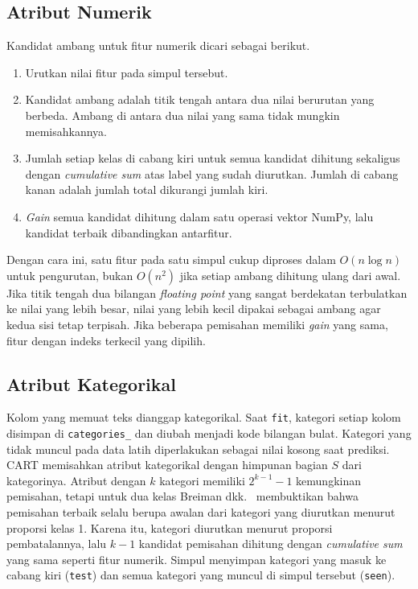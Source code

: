 \subsection{Atribut Numerik}

Kandidat ambang untuk fitur numerik dicari sebagai berikut.
\begin{enumerate}
	\item Urutkan nilai fitur pada simpul tersebut.
	\item Kandidat ambang adalah titik tengah antara dua nilai berurutan yang
	berbeda. Ambang di antara dua nilai yang sama tidak mungkin memisahkannya.
	\item Jumlah setiap kelas di cabang kiri untuk semua kandidat dihitung
	sekaligus dengan \textit{cumulative sum} atas label yang sudah diurutkan.
	Jumlah di cabang kanan adalah jumlah total dikurangi jumlah kiri.
	\item \textit{Gain} semua kandidat dihitung dalam satu operasi vektor NumPy,
	lalu kandidat terbaik dibandingkan antarfitur.
\end{enumerate}
Dengan cara ini, satu fitur pada satu simpul cukup diproses dalam
$O(n\log n)$ untuk pengurutan, bukan $O(n^2)$ jika setiap ambang dihitung ulang
dari awal. Jika titik tengah dua bilangan \textit{floating point} yang sangat
berdekatan terbulatkan ke nilai yang lebih besar, nilai yang lebih kecil dipakai
sebagai ambang agar kedua sisi tetap terpisah. Jika beberapa pemisahan memiliki
\textit{gain} yang sama, fitur dengan indeks terkecil yang dipilih.

\subsection{Atribut Kategorikal}

Kolom yang memuat teks dianggap kategorikal. Saat \texttt{fit}, kategori setiap
kolom disimpan di \texttt{categories\_} dan diubah menjadi kode bilangan bulat.
Kategori yang tidak muncul pada data latih diperlakukan sebagai nilai kosong saat
prediksi. CART memisahkan atribut kategorikal dengan himpunan bagian $S$ dari
kategorinya. Atribut dengan $k$ kategori memiliki $2^{k-1}-1$ kemungkinan
pemisahan, tetapi untuk dua kelas Breiman dkk.~\cite{breiman1984cart} membuktikan bahwa
pemisahan terbaik selalu berupa awalan dari kategori yang diurutkan menurut
proporsi kelas 1. Karena itu, kategori diurutkan menurut proporsi pembatalannya,
lalu $k-1$ kandidat pemisahan dihitung dengan \textit{cumulative sum} yang sama
seperti fitur numerik. Simpul menyimpan kategori yang masuk ke cabang kiri
(\texttt{test}) dan semua kategori yang muncul di simpul tersebut
(\texttt{seen}).

